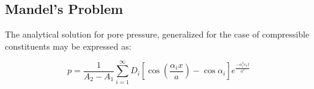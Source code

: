 \subsection{Mandel's Problem}



The analytical solution for pore pressure, generalized for the case of compressible
constituents may be expressed as\cite{Cheng:Detourany:1988}:

\begin{equation}
 p = \frac{1}{A_{2} - A_{1}}   \sum_{i=1}^{\infty} D_{i} \left[ \cos \left( \frac{\alpha_{i}x}{a} \right) - \cos \alpha_{i} \right] e^{\frac{-\alpha_{i}^{2} c_{x} t}{a^{2}}} 
\end{equation}



